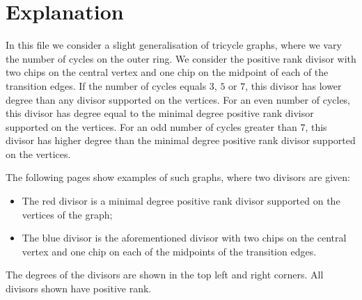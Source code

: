 \documentclass{article}
\begin{document}
\section*{Explanation}
In this file we consider a slight generalisation of tricycle graphs, where we vary the number of cycles on the outer ring. We consider the positive rank divisor with two chips on the central vertex and one chip on the midpoint of each of the transition edges. If the number of cycles equals $3$, $5$ or $7$, this divisor has lower degree than any divisor supported on the vertices. For an even number of cycles, this divisor has degree equal to the minimal degree positive rank divisor supported on the vertices. For an odd number of cycles greater than $7$, this divisor has higher degree than the minimal degree positive rank divisor supported on the vertices.

The following pages show examples of such graphs, where two divisors are given:
\begin{itemize}
	\item The \textcolor{red!80!black}{red} divisor is a minimal degree positive rank divisor supported on the vertices of the graph;
	\item The \textcolor{blue!80!black}{blue} divisor is the aforementioned divisor with two chips on the central vertex and one chip on each of the midpoints of the transition edges.
\end{itemize}

The degrees of the divisors are shown in the top left and right corners. All divisors shown have positive rank. 

\end{document}
